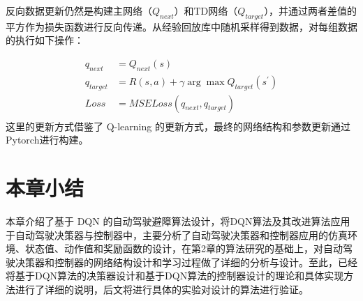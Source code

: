 反向数据更新仍然是构建主网络（$Q_{next}$）和TD网络（$Q_{target}$），并通过两者差值的平方作为损失函数进行反向传递。从经验回放库中随机采样得到数据，对每组数据的执行如下操作：

\begin{equation}
    \begin{aligned}
        q_{next} &= Q_{next}(s)\\
        q_{target} &= R(s,a) + \gamma \arg \max Q_{target}(s^{'})\\
        Loss &= MSELoss(q_{next},q_{target})\\
    \end{aligned}
\end{equation}
这里的更新方式借鉴了 Q-learning 的更新方式，最终的网络结构和参数更新通过Pytorch进行构建。

\section{本章小结} %

本章介绍了基于 DQN 的自动驾驶避障算法设计，将DQN算法及其改进算法应用于自动驾驶决策器与控制器中，主要分析了自动驾驶决策器和控制器应用的仿真环境、状态值、动作值和奖励函数的设计，在第2章的算法研究的基础上，对自动驾驶决策器和控制器的网络结构设计和学习过程做了详细的分析与设计。至此，已经将基于DQN算法的决策器设计和基于DQN算法的控制器设计的理论和具体实现方法进行了详细的说明，后文将进行具体的实验对设计的算法进行验证。
